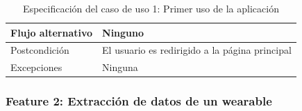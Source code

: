 \begin{table}[h]
\begin{tabularx}{\textwidth}{|l|l|X|}
            \hline
            Flujo alternativo & \multicolumn{2}{|X|}{Ninguno} \\
            \hline
            Postcondición & \multicolumn{2}{|X|}{El usuario es redirigido a la página principal} \\
            \hline
            Excepciones & \multicolumn{2}{|X|}{Ninguna} \\
            \hline
        \end{tabularx}
        \caption{Especificación del caso de uso 1: Primer uso de la aplicación}
        \label{tabla:casos_uso:primer_uso}
    \end{table}    
    
    \subsubsection{Feature 2: Extracción de datos de un \gls{wearable}}


